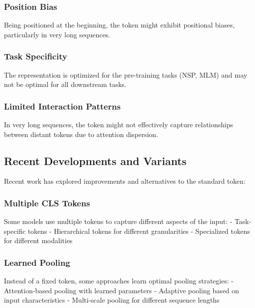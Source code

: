 \subsubsection{Position Bias}
Being positioned at the beginning, the \cls{} token might exhibit positional biases, particularly in very long sequences.

\subsubsection{Task Specificity}
The \cls{} representation is optimized for the pre-training tasks (NSP, MLM) and may not be optimal for all downstream tasks.

\subsubsection{Limited Interaction Patterns}
In very long sequences, the \cls{} token might not effectively capture relationships between distant tokens due to attention dispersion.

\subsection{Recent Developments and Variants}

Recent work has explored improvements and alternatives to the standard \cls{} token:

\subsubsection{Multiple CLS Tokens}
Some models use multiple \cls{} tokens to capture different aspects of the input:
- Task-specific \cls{} tokens
- Hierarchical \cls{} tokens for different granularities
- Specialized \cls{} tokens for different modalities

\subsubsection{Learned Pooling}
Instead of a fixed \cls{} token, some approaches learn optimal pooling strategies:
- Attention-based pooling with learned parameters
- Adaptive pooling based on input characteristics
- Multi-scale pooling for different sequence lengths


